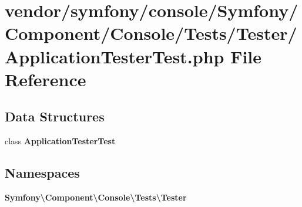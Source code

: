 \section{vendor/symfony/console/\+Symfony/\+Component/\+Console/\+Tests/\+Tester/\+Application\+Tester\+Test.php File Reference}
\label{_application_tester_test_8php}
\subsection*{Data Structures}
\begin{DoxyCompactItemize}
\item 
class {\bf Application\+Tester\+Test}
\end{DoxyCompactItemize}
\subsection*{Namespaces}
\begin{DoxyCompactItemize}
\item 
 {\bf Symfony\textbackslash{}\+Component\textbackslash{}\+Console\textbackslash{}\+Tests\textbackslash{}\+Tester}
\end{DoxyCompactItemize}
